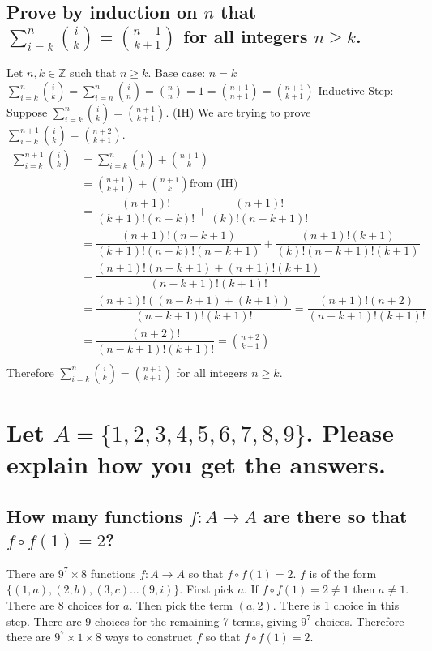 \documentclass[10pt, letterpaper, titlepage]{article}
\newcommand{\0}{\varnothing}
\newcommand{\Z}{\mathbb{Z}}
\newcommand{\1}{\{ 1 \}}
\newcommand{\2}{\{ (1,1) \}}
\begin{document}
        \subsection{Prove by induction on $n$ that $\sum_{i=k}^{n} \binom{i}{k} = \binom{n+1}{k+1}$ for all integers $n \geq k$.}
            Let $n,k \in \Z$ such that $n \geq k$.
            Base case: $n = k$
            $\sum_{i=k}^{n} \binom{i}{k} = \sum_{i=n}^{n} \binom{i}{n} = \binom{n}{n} = 1 = \binom{n+1}{n+1} = \binom{n+1}{k+1}$
            Inductive Step:
            Suppose $\sum_{i=k}^{n} \binom{i}{k} = \binom{n+1}{k+1}$. (IH)
            We are trying to prove $\sum_{i=k}^{n+1} \binom{i}{k} = \binom{n+2}{k+1}$.
            \begin{align*}
                \sum_{i=k}^{n+1} \binom{i}{k} &= \sum_{i=k}^{n} \binom{i}{k} + \binom{n+1}{k}\\
                &= \binom{n+1}{k+1} + \binom{n+1}{k} \text{from (IH)}\\
                &= \dfrac{(n+1)!}{(k+1)!(n-k)!}+ \dfrac{(n+1)!}{(k)!(n-k+1)!}\\
                &= \dfrac{(n+1)!(n-k+1)}{(k+1)!(n-k)!(n-k+1)}+ \dfrac{(n+1)!(k+1)}{(k)!(n-k+1)!(k+1)}\\
                &= \dfrac{(n+1)!(n-k+1)+ (n+1)!(k+1)}{(n-k+1)!(k+1)!}\\
                &= \dfrac{(n+1)!((n-k+1)+(k+1))}{(n-k+1)!(k+1)!} = \dfrac{(n+1)!(n+2)}{(n-k+1)!(k+1)!}\\
                &= \dfrac{(n+2)!}{(n-k+1)!(k+1)!} = \binom{n+2}{k+1}\\
            \end{align*}
            Therefore  $\sum_{i=k}^{n} \binom{i}{k} = \binom{n+1}{k+1}$ for all integers $n \geq k$.

    \newpage
    \section{Let $A = \{1,2,3,4,5,6,7,8,9\}$. Please explain how you get the answers.}
        \subsection{How many functions $f:A \to A$ are there so that $f \circ f(1) = 2$?}
            There are $9^7 \times 8$ functions $f: A\to A$ so that $f\circ f(1) =2$.
            $f$ is of the form $\{(1, a), (2,b),(3,c) \hdots (9,i)\}$.
            First pick $a$. If $f\circ f(1) = 2 \neq 1$ then $a \neq 1$. There are 8 choices for $a$.
            Then pick the term $(a, 2)$. There is 1 choice in this step.
            There are 9 choices for the remaining 7 terms, giving $9^7$ choices.
            Therefore there are $9^7 \times 1 \times 8$ ways to construct $f$ so that $f\circ f(1) = 2$.
\end{document}
